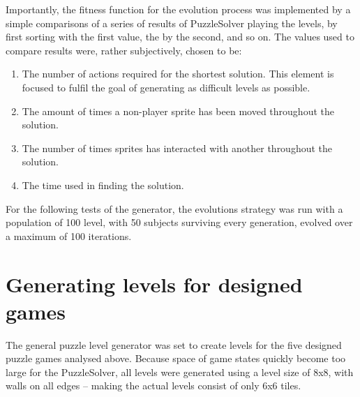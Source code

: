 \documentclass[a4paper,titlepage,final]{report}
\begin{document}
Importantly, the fitness function for the evolution process was implemented by a simple comparisons of a series of results of PuzzleSolver playing the levels, by first sorting with the first value, the by the second, and so on. 
The values used to compare results were, rather subjectively, chosen to be:

\begin{enumerate}
\item The number of actions required for the shortest solution. This element is focused to fulfil the goal of generating as difficult levels as possible.
\item The amount of times a non-player sprite has been moved throughout the solution.
\item The number of times sprites has interacted with another throughout the solution.
\item The time used in finding the solution.
\end{enumerate}

For the following tests of the generator, the evolutions strategy was run with a population of 100 level, with 50 subjects surviving every generation, evolved over a maximum of 100 iterations.





%






\section{Generating levels for designed games} 
\label{sec_task3evolvingLevelsResults}
The general puzzle level generator was set to create levels for the five designed puzzle games analysed above.
Because space of game states quickly become too large for the PuzzleSolver, all levels were generated using a level size of 8x8, with walls on all edges -- making the actual levels consist of only 6x6 tiles.
\end{document}
